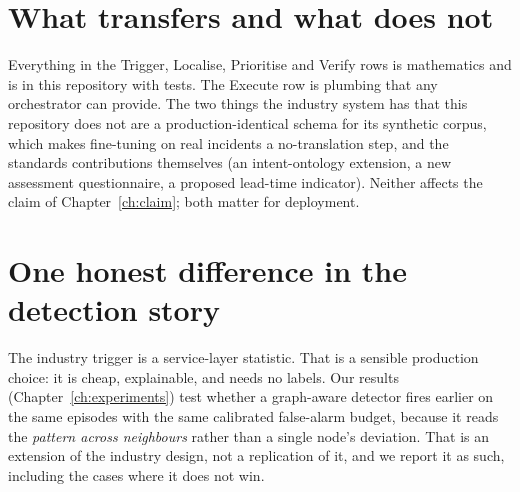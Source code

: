 \section{What transfers and what does not}
Everything in the Trigger, Localise, Prioritise and Verify rows is mathematics and is in this
repository with tests. The Execute row is plumbing that any orchestrator can provide. The two
things the industry system has that this repository does not are a production-identical schema for
its synthetic corpus, which makes fine-tuning on real incidents a no-translation step, and the
standards contributions themselves (an intent-ontology extension, a new assessment questionnaire,
a proposed lead-time indicator). Neither affects the claim of Chapter~\ref{ch:claim}; both matter
for deployment.

\section{One honest difference in the detection story}
The industry trigger is a service-layer statistic. That is a sensible production choice: it is
cheap, explainable, and needs no labels. Our results (Chapter~\ref{ch:experiments}) test whether a
graph-aware detector fires earlier on the same episodes with the same calibrated false-alarm
budget, because it reads the \emph{pattern across neighbours} rather than a single node's
deviation. That is an extension of the industry design, not a replication of it, and we report it
as such, including the cases where it does not win.
